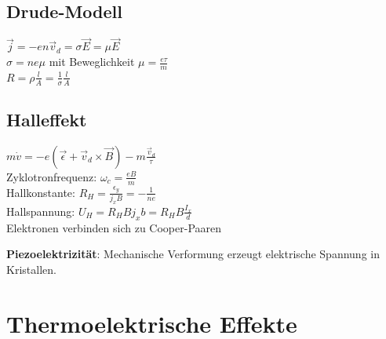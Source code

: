 \documentclass[fs, footer]{latex4ei}
\begin{document}
\begin{multicols*}{4}
{		\subsection{Drude-Modell}
		$\vec j = -en\vec v_d = \sigma\vec E = \mu\vec E$\\
		$\sigma = ne\mu$ mit Beweglichkeit $\mu = \frac{e\tau}{m}$\\
		$R = \rho \frac{l}{A} = \frac{1}{\sigma} \frac{l}{A}$ 
		
		\subsection{Halleffekt}
		$m\dot v = -e(\vec \epsilon + \vec v_d \times \vec B) - m \frac{\vec v_d}{\tau}$\\
		Zyklotronfrequenz: $\omega_c = \frac{eB}{m}$\\
		Hallkonstante: $R_H = \frac{\epsilon_y}{j_xB} = -\frac{1}{ne}$\\
		Hallspannung: $U_H = R_HBj_xb = R_HB\frac{I_x}{d}$\\

		Elektronen verbinden sich zu Cooper-Paaren

	}		
				
		\textbf{Piezoelektrizität}: Mechanische Verformung erzeugt elektrische Spannung in Kristallen.\\

\section{Thermoelektrische Effekte}
\end{multicols*}
\end{document}

